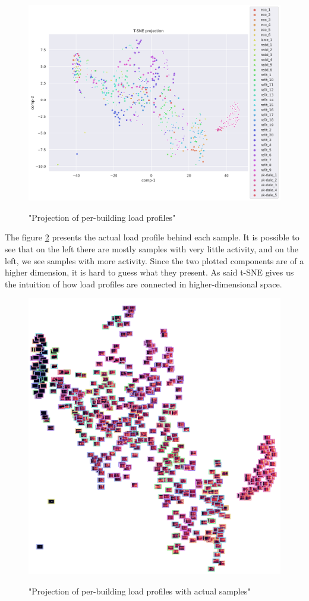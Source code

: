 \begin{figure}[H]
	\centering
	\caption{"Projection of per-building load profiles"}
	\includegraphics[width=1.2\textwidth]{Figures/TSNE/TSNE_per_building/non_norm/scatter_non_norm_all.png}
	\label{fig:tsne_scatter_non_norm_all}
\end{figure}

The figure \ref{fig:tsne_pb_img_scatter_allall} presents the actual load profile behind each sample. 
It is possible to see that on the left there are mostly samples with very little activity,
and on the left, we see samples with more activity.
Since the two plotted components are of a higher dimension, it is hard to guess what they present.
As said t-SNE gives us the intuition of how load profiles are connected in higher-dimensional space.

\begin{figure}[H]
	\centering
	\caption{"Projection of per-building load profiles with actual samples"}
	\includegraphics[width=.9\textwidth]{Figures/TSNE/TSNE_per_building/non_norm/img_scatter_allall.png}
	\label{fig:tsne_pb_img_scatter_allall}
\end{figure}

